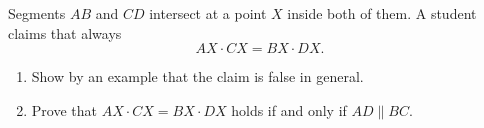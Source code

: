 Segments $AB$ and $CD$ intersect at a point $X$ inside both of them. A student claims that always
\[
AX\cdot CX=BX\cdot DX .
\]
\begin{enumerate}
\item[(a)] Show by an example that the claim is false in general.
\item[(b)] Prove that $AX\cdot CX=BX\cdot DX$ holds if and only if $AD\parallel BC$.
\end{enumerate}
